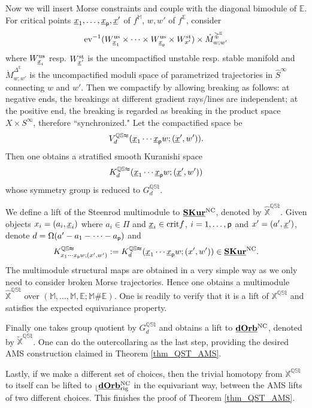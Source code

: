 \documentclass[reqno, 10pt]{amsart}
\numberwithin{equation}{section}
\numberwithin{equation}{section}
\theoremstyle{definition}
\theoremstyle{remark}
\newcommand{\beqn}{\begin{equation*}}
\newcommand{\eeqn}{\end{equation*}}
\newcommand{\mb}{\mathbb}
\newcommand{\p}{{\sf p}}
\newcommand{\ep}{{{\mathbb E}}}
\renewcommand{\outer}{{}_{\lfloor}}
\newcommand{\wh}{\widehat}
\newcommand{\uds}[1]{\underline{\smash{#1}}}
\newcommand{\ev}{{\rm ev}}
\begin{document}
Now we will insert Morse constraints and couple with the diagonal bimodule of $\ep$. For critical points $\uds x_1, \ldots, \uds x_\p, \uds x'$ of $f^{\mb M}$, $w, w'$ of $f^{\ep}$, consider 
\beqn
\ev^{-1}( W_{\uds x_1}^{\rm us} \times \cdots \times W_{\uds x_\p}^{\rm us} \times W_{x'}^{\rm st}) \times \mathring M_{w;w'}^{{\mb\Delta}^\ep}
\eeqn
where $W_{\uds x_i}^{\rm us}$ resp. $W_{\uds x'}^{\rm st}$ is the uncompactified unstable resp. stable manifold and $\mathring M_{w;w'}^{\mb{\Delta}^\ep}$ is the uncompactified moduli space of parametrized trajectories in $\wh S^\infty$ connecting $w$ and $w'$. Then we compactify by allowing breaking as follows: at negative ends, the breakings at different gradient rays/lines are independent; at the positive end, the breaking is regarded as breaking in the product space $X \times S^\infty$, therefore ``synchronized." Let the compactified space be
\beqn
V_d^{\mb{QSt}} (\uds x_1 \cdots \uds x_\p w; (\uds x',w')).
\eeqn
Then one obtains a stratified smooth Kuranishi space
\beqn
K_d^{\mb{QSt}} ( \uds x_1 \cdots \uds x_\p w; (\uds x', w'))
\eeqn
whose symmetry group is reduced to $G_d^{\mb{QSt}}$.

We define a lift of the Steenrod multimodule to $\uds {\bf SKur}^{\rm NC}$, denoted by $\hat{\mb X}^{\mb{QSt}}$. Given objects $x_i = (a_i, \uds x_i)$ where $a_i \in \Pi$ and $\uds x_i \in {\rm crit} f$, $i = 1, \ldots, \p$ and $x' = (a', \uds x')$, denote $d = \Omega(a' - a_1- \cdots - a_\p)$ and 
\beqn
K_{x_1 \cdots x_{\p} w; (x', w')}^{\mb{QSt}}:= K_d^{\mb{QSt}} (\uds x_1\cdots \uds x_\p w; (x', w')) \in \uds{\bf SKur}^{\rm NC}.
\eeqn
The multimodule structural maps are obtained in a very simple way as we only need to consider broken Morse trajectories. Hence one obtains a multimodule $\hat {\mb X}^{\mb{QSt}}$ over $({\mb M}, \ldots, {\mb M}, \ep; {\mb M}\# {\mb E})$. One is readily to verify that it is a lift of ${\mb X}^{\mb{QSt}}$ and satisfies the expected equivariance property. 

Finally one takes group quotient by $G_d^{\mb{QSt}}$ and obtains a lift to $\uds{\bf dOrb}^{\rm NC}$, denoted by $\tilde{\mb X}^{\mb{QSt}}$. One can do the outercollaring as the last step, providing the desired AMS construction claimed in Theorem \ref{thm_QST_AMS}. 

Lastly, if we make a different set of choices, then the trivial homotopy from ${\mb X}^{\mb{QSt}}$ to itself can be lifted to $\outer \uds{\bf dOrb}_{\rm rig}^{\rm NC}$ in the equivariant way, between the AMS lifts of two different choices. This finishes the proof of Theorem \ref{thm_QST_AMS}.
\end{document}

